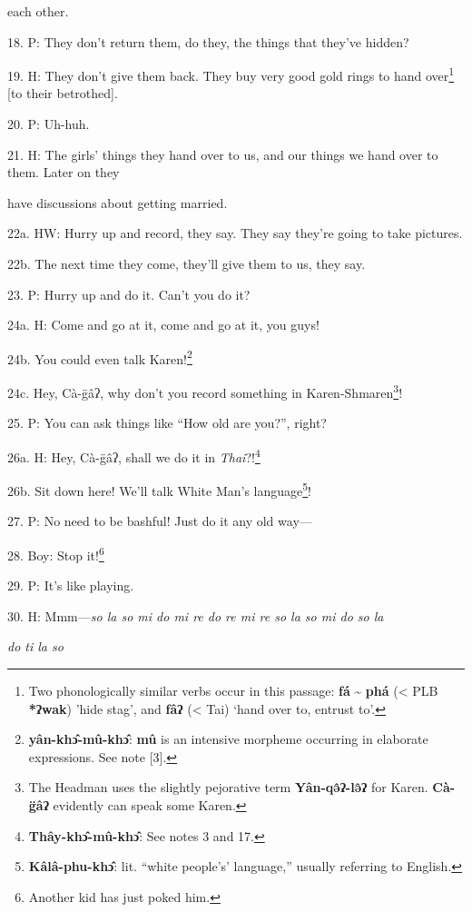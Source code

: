 each other.

18. P: They don't return them, do they, the things that they've hidden?

19. H: They don't give them back. They buy very good gold rings to hand over\footnote{Two phonologically similar verbs occur in this passage: \textbf{fá} \textasciitilde{} \textbf{phá} (< PLB \textbf{*ʔwak}) 'hide stag', and \textbf{fâʔ} (< Tai) `hand over to, entrust to'.}
[to their betrothed].

20. P: Uh-huh.

21. H: The girls' things they hand over to us, and our things we hand over to them.
Later on they

have discussions about getting married.

22a. HW: Hurry up and record, they say. They say they're going to take pictures.

22b. The next time they come, they'll give them to us, they say.

23. P: Hurry up and do it. Can't you do it?

24a. H: Come and go at it, come and go at it, you guys!

24b. You could even talk Karen!\footnote{\textbf{yân-khɔ̂-mû-khɔ̂}: \textbf{mû} is an intensive morpheme occurring in elaborate expressions. See note [3].}

24c. Hey, Cà-g̈âʔ, why don't you record something in Karen-Shmaren\footnote{The Headman uses the slightly pejorative term \textbf{Yân-qə̂ʔ-lə̂ʔ} for Karen. \textbf{Cà-g̈âʔ} evidently can speak some Karen.}!

25. P: You can ask things like ``How old are you?'', right?

26a. H: Hey, Cà-g̈âʔ, shall we do it in \textit{Thai}?!\footnote{\textbf{Thây-khɔ̂-mû-khɔ̂}: See notes 3 and 17.}

26b. Sit down here! We'll talk White Man's language\footnote{\textbf{Kâlâ-phu-khɔ̂}: lit. ``white people's' language,'' usually referring to English.}!


27. P: No need to be bashful! Just do it any old way---

28. Boy: Stop it!\footnote{Another kid has just poked him.}

29. P: It's like playing.

30. H:  Mmm---\textit{so la so mi do mi re do re mi re
so la so mi do so la }

\textit{do ti la so} \textit{\textbf{
}}

